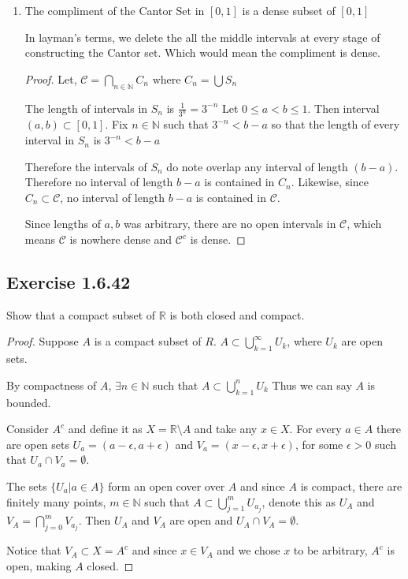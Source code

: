 \documentclass{tufte-book}
\theoremstyle{mytheoremstyle}
\theoremstyle{mylemstyle}
\theoremstyle{mydefstyle}
\begin{document}
\begin{enumerate}
\begin{proof}
This implies that the sequence of $x_m$ converges to $x$ and such is an accumulation point.  Since we chose $x$ to be arbitrary, this applies to all $x \in \mathcal{C}$.  
\end{proof}

\item The compliment of the Cantor Set in $[0,1]$ is a dense subset of $[0,1]$

In layman's terms, we delete the all the middle intervals at every stage of constructing the Cantor set.  Which would mean the compliment is dense.

\begin{proof} Let, $\mathcal{C} = \bigcap\limits_{n \in \mathbb{N}}C_n \text{ where }C_n = \bigcup S_n$

The length of intervals in $S_n$ is $\frac{1}{3^n} = 3^{-n}$ Let $0 \leq a < b \leq 1$. Then interval $(a, b) \subset [0,1]$.  Fix $n \in \mathbb{N}$ such that $3^{-n} < b-a$ so that the length of every interval in $S_n$ is $3^{-n} < b-a$

Therefore the intervals of $S_n$ do note overlap any interval of length $(b-a)$.  Therefore no interval of length $b-a$ is contained in $C_n$.  Likewise, since $C_n \subset \mathcal{C}$, no interval of length $b-a$ is contained in $\mathcal{C}$.

Since lengths of $a,b$ was arbitrary, there are no open intervals in $\mathcal{C}$, which means $\mathcal{C}$ is nowhere dense and $\mathcal{C}^c$ is dense.
\end{proof}

\end{enumerate}

\subsection{Exercise 1.6.42}
Show that a compact subset of $\mathbb{R}$ is both closed and compact.

\begin{proof}
Suppose $A$ is a compact subset of $R$.  $A \subset \bigcup\limits_{k=1}^{\infty}U_k$, where $U_k$ are open sets.

By compactness of $A$, $\exists n \in \mathbb{N}$ such that $A \subset \bigcup\limits_{k=1}^{n}U_k$ Thus we can say $A$ is bounded.

Consider $A^c$ and define it as $X = \mathbb{R} \setminus A$ and take any $x \in X$. For every $a \in A$ there are open sets $U_a = (a-\epsilon,a+\epsilon)$ and $V_a = (x-\epsilon, x+\epsilon)$, for some $\epsilon > 0$ such that $U_a \cap V_a = \emptyset$.

The sets $\{U_a | a \in A\}$ form an open cover over $A$ and since $A$ is compact, there are finitely many points, $m \in \mathbb{N}$ such that $A \subset \bigcup\limits_{j=1}^{m}U_{a_{j}}$, denote this as $U_A$ and $V_A=\bigcap\limits_{j=0}^{m}V_{a_{j}}$.  Then $U_A$ and $V_A$ are open and $U_A \cap V_A = \emptyset$.

Notice that $V_A \subset X = A^c$ and since $x \in V_A$ and we chose $x$ to be arbitrary,  $A^c$ is open, making $A$ closed.

\end{proof}
\end{document}
